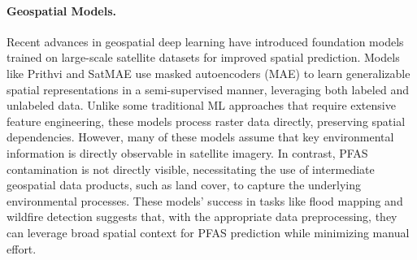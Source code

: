 \paragraph{Geospatial Models.}
Recent advances in geospatial deep learning have introduced foundation models trained on large-scale satellite datasets for improved spatial prediction. Models like Prithvi \cite{Blumenfeld_2023} and SatMAE \cite{Cong_Khanna_Meng_Liu_Rozi_He_Burke_Lobell_Ermon_2023} use masked autoencoders (MAE) to learn generalizable spatial representations in a semi-supervised manner, leveraging both labeled and unlabeled data. Unlike some traditional ML approaches that require extensive feature engineering, these models process raster data directly, preserving spatial dependencies. 
However, many of these models assume that key environmental information is directly observable in satellite imagery. In contrast, PFAS contamination is not directly visible, necessitating the use of intermediate geospatial data products, such as land cover, to capture the underlying environmental processes. These models' success in tasks like flood mapping and wildfire detection \cite{Blumenfeld_2023} suggests that, with the appropriate data preprocessing, they can leverage broad spatial context for PFAS prediction while minimizing manual effort.

